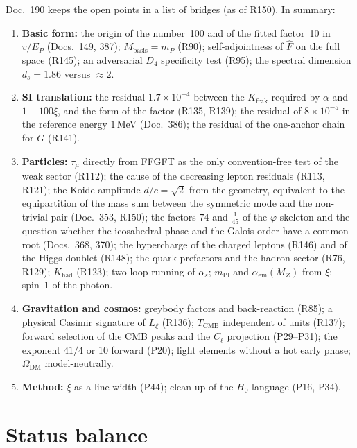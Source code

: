 Doc.~190 keeps the open points in a list of bridges (as of R150). In summary:
\begin{enumerate}[leftmargin=*,itemsep=1pt]
\item \textbf{Basic form:} the origin of the number~100 and of the fitted factor~10 in $v/E_P$ (Docs.~149, 387);
  $M_{\text{basis}}=m_P$ (R90); self-adjointness of $\hat F$ on the full space (R145); an
  adversarial $D_4$ specificity test (R95); the spectral dimension $d_s=1.86$ versus $\approx2$.
\item \textbf{SI translation:} the residual $1.7\times10^{-4}$ between the $K_{\text{frak}}$ required by
  $\alpha$ and $1-100\xi$, and the form of the factor (R135, R139); the residual of
  $8\times10^{-5}$ in the reference energy $1$\,MeV (Doc.~386); the residual of the one-anchor chain for $G$ (R141).
\item \textbf{Particles:} $\tau_\mu$ directly from FFGFT as the only convention-free test of the weak
  sector (R112); the cause of the decreasing lepton residuals (R113, R121); the Koide amplitude
  $d/c=\sqrt2$ from the geometry, equivalent to the equipartition of the mass sum between the
  symmetric mode and the non-trivial pair (Doc.~353, R150); the factors $74$ and $\tfrac1{45}$ of the $\varphi$ skeleton and
  the question whether the icosahedral phase and the Galois order have a common root (Docs.~368,
  370); the hypercharge of the charged leptons (R146) and of the Higgs doublet (R148); the quark
  prefactors and the hadron sector (R76, R129); $K_{\text{had}}$ (R123); two-loop running of
  $\alpha_s$; $m_{\text{Pl}}$ and $\alpha_{\text{em}}(M_Z)$ from $\xi$; spin~1 of the photon.
\item \textbf{Gravitation and cosmos:} greybody factors and back-reaction (R85); a physical Casimir
  signature of $L_\xi$ (R136); $T_{\text{CMB}}$ independent of units (R137); forward selection of
  the CMB peaks and the $C_\ell$ projection (P29--P31); the exponent $41/4$ or 10 forward (P20);
  light elements without a hot early phase; $\Omega_{\text{DM}}$ model-neutrally.
\item \textbf{Method:} $\xi$ as a line width (P44); clean-up of the $H_0$ language (P16, P34).
\end{enumerate}

\section{Status balance}

